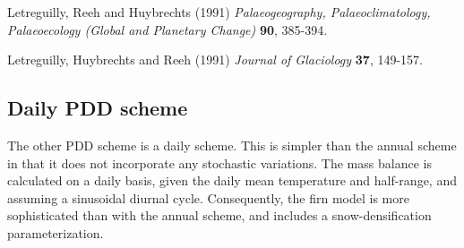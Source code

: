 \noindent Letreguilly, Reeh and  Huybrechts (1991) \emph{Palaeogeography,
Palaeoclimatology, Palaeoecology (Global and Planetary Change)}
\textbf{90}, 385-394.

\noindent Letreguilly, Huybrechts  and  Reeh (1991) \emph{Journal of
Glaciology} \textbf{37}, 149-157.
%
%
\subsection{Daily PDD scheme}
\label{ug.mbal.daily_pdd_scheme}
The other PDD scheme is a daily scheme. This is simpler than the annual scheme in that it does not incorporate any stochastic variations. The mass balance is calculated on a daily basis, given the daily mean temperature and half-range, and assuming a sinusoidal diurnal cycle. Consequently, the firn model is more sophisticated than with the annual scheme, and includes a snow-densification parameterization.
%
